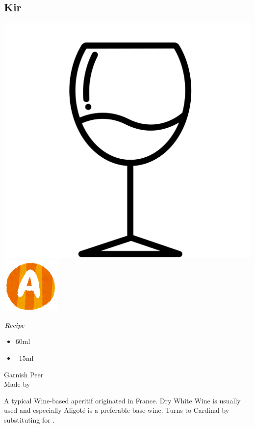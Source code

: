 \subsection{Kir}
\vspace{-7.6mm}
\hspace{18mm}
\includegraphics[scale=.03]{cocktail_glass_sour.png}
\includegraphics[scale=.12]{capital_a.png}
\vspace{2.5mm}
\begin{itembox}[l]{\boldmath $Recipe$}
\begin{itemize}
\setlength{\parskip}{0cm}
\setlength{\itemsep}{0cm}
\item \ww 60ml
\item {}--15ml
\end{itemize}
\vspace{-4mm}
Garnish \lemon Peer\\
Made by \build
\end{itembox}
A typical Wine-based aperitif originated in France.
Dry White Wine is usually used and especially Aligot\'{e} is a preferable base wine.
Turns to Cardinal by substituting \rw for \ww
\hspace{-1mm}.
